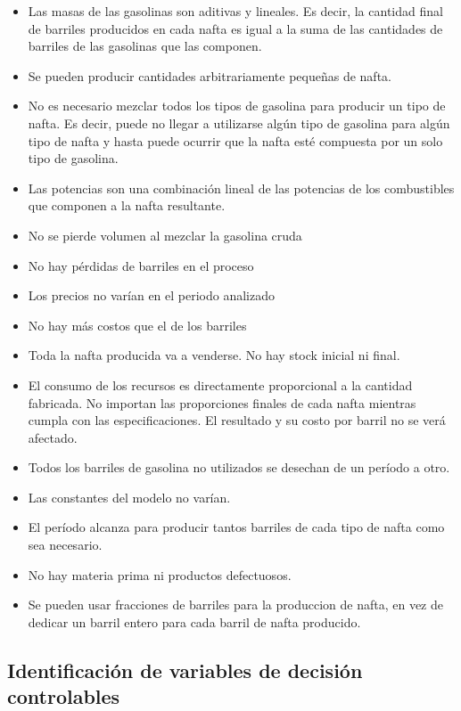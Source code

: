 \documentclass[
]{article}
\providecommand{\tightlist}{%
  \setlength{\itemsep}{0pt}\setlength{\parskip}{0pt}}
\begin{document}
\begin{itemize}
\tightlist
\item
  Las masas de las gasolinas son aditivas y lineales. Es decir, la
  cantidad final de barriles producidos en cada nafta es igual a la suma
  de las cantidades de barriles de las gasolinas que las componen.
\item
  Se pueden producir cantidades arbitrariamente pequeñas de nafta.
\item
  No es necesario mezclar todos los tipos de gasolina para producir un
  tipo de nafta. Es decir, puede no llegar a utilizarse algún tipo de
  gasolina para algún tipo de nafta y hasta puede ocurrir que la nafta
  esté compuesta por un solo tipo de gasolina.
\item
  Las potencias son una combinación lineal de las potencias de los
  combustibles que componen a la nafta resultante.
\item
  No se pierde volumen al mezclar la gasolina cruda
\item
  No hay pérdidas de barriles en el proceso
\item
  Los precios no varían en el periodo analizado
\item
  No hay más costos que el de los barriles
\item
  Toda la nafta producida va a venderse. No hay stock inicial ni final.
\item
  El consumo de los recursos es directamente proporcional a la cantidad
  fabricada. No importan las proporciones finales de cada nafta mientras
  cumpla con las especificaciones. El resultado y su costo por barril no
  se verá afectado.
\item
  Todos los barriles de gasolina no utilizados se desechan de un período
  a otro.
\item
  Las constantes del modelo no varían.
\item
  El período alcanza para producir tantos barriles de cada tipo de nafta
  como sea necesario.
\item
  No hay materia prima ni productos defectuosos.
\item
  Se pueden usar fracciones de barriles para la produccion de nafta, en
  vez de dedicar un barril entero para cada barril de nafta producido.
\end{itemize}

\hypertarget{identificaciuxf3n-de-variables-de-decisiuxf3n-controlables}{%
\subsection{Identificación de variables de decisión
controlables}\label{identificaciuxf3n-de-variables-de-decisiuxf3n-controlables}}
\end{document}
